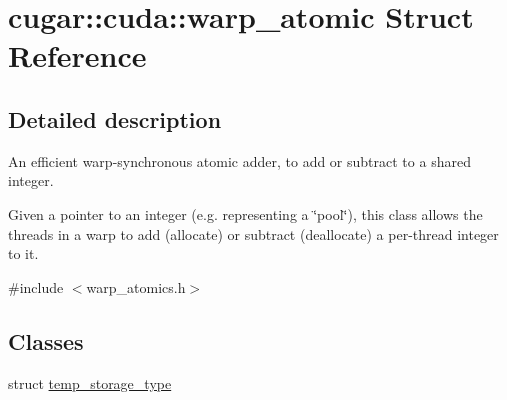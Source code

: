 \hypertarget{structcugar_1_1cuda_1_1warp__atomic}{}\section{cugar\+:\+:cuda\+:\+:warp\+\_\+atomic Struct Reference}
\label{structcugar_1_1cuda_1_1warp__atomic}


\subsection{Detailed description}
An efficient warp-\/synchronous atomic adder, to add or subtract to a shared integer.

Given a pointer to an integer (e.\+g. representing a \char`\"{}pool\char`\"{}), this class allows the threads in a warp to add (allocate) or subtract (deallocate) a per-\/thread integer to it. 

{\ttfamily \#include $<$warp\+\_\+atomics.\+h$>$}

\subsection*{Classes}
\begin{DoxyCompactItemize}
\item 
struct \hyperlink{structcugar_1_1cuda_1_1warp__atomic_1_1temp__storage__type}{temp\+\_\+storage\+\_\+type}
\end{DoxyCompactItemize}
